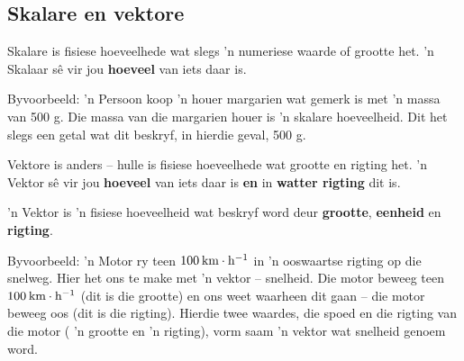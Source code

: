\subsection*{Skalare en vektore}
            \nopagebreak

Skalare is fisiese hoeveelhede wat slegs  'n numeriese waarde of grootte het.  'n Skalaar s\^{e} vir jou \textbf{hoeveel} van iets daar is.  


Byvoorbeeld:  'n Persoon koop  'n houer margarien wat gemerk is met  'n massa van 500 g. Die massa van die margarien houer is  'n skalare hoeveelheid. Dit het slegs een getal wat dit beskryf, in hierdie geval, 500 g. 

Vektore is anders – hulle is fisiese hoeveelhede wat grootte en rigting het.  'n Vektor sê vir jou \textbf{hoeveel} van iets daar is \textbf{en} in \textbf{watter rigting} dit is.

 { 'n Vektor is  'n fisiese hoeveelheid wat beskryf word deur \textbf{grootte}, \textbf{eenheid} en \textbf{rigting}.}



 

Byvoorbeeld:  'n Motor ry teen $100\phantom{\rule{2pt}{0ex}}\text{km}\ensuremath{\cdot}\text{h}{}^{-1}$ in  'n ooswaartse rigting op die snelweg. Hier het ons te make met  'n vektor – snelheid. Die motor beweeg teen $100\phantom{\rule{2pt}{0ex}}\text{km}\ensuremath{\cdot}\text{h}{}^{-1}$ (dit is die grootte) en ons weet waarheen dit gaan – die motor beweeg oos (dit is die rigting). Hierdie twee waardes, die spoed en die rigting van die motor ( 'n grootte en  'n rigting), vorm saam  'n vektor wat snelheid genoem word.

